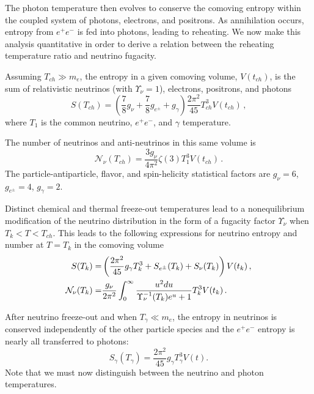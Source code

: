 The photon temperature then evolves to conserve the comoving entropy within the coupled system of photons, electrons, and positrons. As annihilation occurs, entropy from $e^+e^-$ is fed into photons, leading to reheating. We now make this analysis quantitative in order to derive a relation between the reheating temperature ratio and neutrino fugacity.

Assuming $T_{ch}\gg m_e$, the entropy in a given comoving volume, $V(t_{ch})$, is the sum of relativistic neutrinos (with $\Upsilon_\nu=1$), electrons, positrons, and photons
\begin{equation}
S(T_{ch})=\left(\frac{7}{8}g_\nu+\frac{7}{8}g_{e^\pm} +g_\gamma \right)\frac{2\pi^2}{45} T_{ch}^3V(t_{ch})\,,
\end{equation}
where $T_1$ is the common neutrino, $e^+e^-$, and $\gamma$ temperature. 

The number of neutrinos and anti-neutrinos in this same volume is
\begin{equation}
\mathcal{N}_\nu(T_{ch})=\frac{3g_\nu}{4\pi^2}\zeta(3)T_1^3V(t_{ch})\,.
\end{equation}
The particle-antiparticle, flavor, and spin-helicity statistical factors are $g_\nu=6$, $g_{e^\pm}=4$, $g_\gamma=2$.

Distinct chemical and thermal freeze-out temperatures lead to a nonequilibrium modification of the neutrino distribution in the form of a fugacity factor $\Upsilon_\nu$ when $T_k<T<T_{ch}$. This leads to the following expressions for neutrino entropy and number at $T=T_k$ in the comoving volume
\begin{align}
S(T_k)=&\left(\frac{2\pi^2}{45}g_\gamma T_k^3+S_{e^\pm}(T_k)+S_{\nu}(T_k)\right)V(t_k)\,,\\
\mathcal{N}_{\nu}(T_k)=&\frac{g_\nu}{2\pi^2}\int_0^\infty \frac{u^2 du}{\Upsilon_\nu^{-1}(T_k)e^u+1}T_k^3V(t_k)\,.\notag
\end{align}

After neutrino freeze-out and when $T_{\gamma}\ll m_e$, the entropy in neutrinos is conserved independently of the other particle species and the $e^+e^-$ entropy is nearly all transferred to photons:
\begin{equation}
S_{\gamma}(T_\gamma)=\frac{2 \pi^2}{45}g_\gamma T_{\gamma}^3 V(t).
\end{equation}
 Note that we must now distinguish between the neutrino and photon temperatures.


